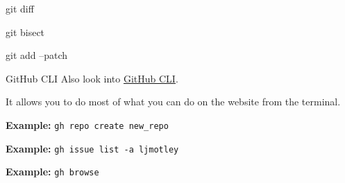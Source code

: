 \begin{frame}{git diff}
\end{frame}

\begin{frame}{git bisect}
\end{frame}

\begin{frame}{git add --patch}
\end{frame}

\begin{frame}{GitHub CLI}
    \stretchon
    Also look into \href{https://cli.github.com/}{GitHub CLI}.

    It allows you to do most of what you can do on the website from the terminal.

    \textbf{Example:} \texttt{gh repo create new\_repo}

    \textbf{Example:} \texttt{gh issue list -a ljmotley}

    \textbf{Example:} \texttt{gh browse}

\end{frame}
